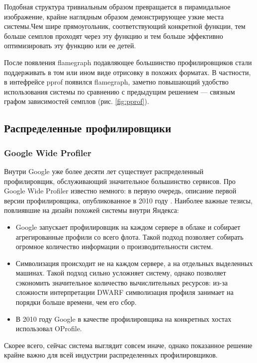 Подобная структура тривиальным образом превращается в пирамидальное изображение, крайне наглядным образом демонстрирующее узкие места системы.Чем шире прямоугольник, соответствующий конкретной функции, тем больше семплов проходят через эту функцию и тем больше эффективно
оптимизировать эту функцию или ее детей.

После появления flamegraph подавляющее большинство профилировщиков стали поддерживать в том или ином виде отрисовку в похожих форматах.
В частности, в интефрейсе pprof появился flamegraph, заметно повышающий удобство использования системы по сравнению с предыдущим решением ---
связным графом зависимостей семплов (рис. \ref{fig:pprof}).

\subsection{Распределенные профилировщики}

\subsubsection{Google Wide Profiler}
Внутри Google уже более десяти лет существует распределенный профилировщик, обслуживающий значительное большинство сервисов.
Про Google Wide Profiler известно немного: в первую очередь, описание первой версии профилировщика, опубликованное в 2010 году \cite{gwp}.
Наиболее важные тезисы, повлиявшие на дизайн похожей системы внутри Яндекса:
\begin{itemize}
    \item
    Google запускает профилировщик на каждом сервере в облаке и собирает агрегированные профили со всего флота.
    Такой подход позволяет собирать огромное количество информации о производительности систем.

    \item
    Символизация происходит не на каждом сервере, а на отдельных выделенных машинах.
    Такой подход сильно усложняет систему, однако позволяет сэкономить значительное количество вычислительных ресурсов:
    из-за сложности интерпретации DWARF символизация профиля занимает на порядки больше времени, чем его сбор.

    \item
    В 2010 году Google в качестве профилировщика на конкретных хостах использовал OProfile.
\end{itemize}
Скорее всего, сейчас система выглядит совсем иначе, однако показанное решение крайне важно для всей индустрии распределенных профилировщиков.

